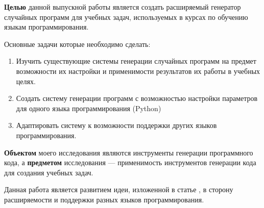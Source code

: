 \textbf{Целью} данной выпускной работы является
создать расширяемый генератор случайных программ для учебных задач, используемых в курсах по обучению языкам программирования.

Основные задачи которые необходимо сделать:
\begin{enumerate}[label=\alph*.]
    \item Изучить существующие системы генерации случайных программ на предмет возможности их
          настройки и применимости результатов их работы в учебных целях.
    \item Создать систему
          генерации программ с возможностью настройки параметров для одного языка программирования (Python)
    \item Адаптировать систему к возможности поддержки других языков программирования.
\end{enumerate}

\textbf{Объектом} моего исследования являются инструменты генерации программного кода, а
\textbf{предметом} исследования --- применимость инструментов генерации кода для создания учебных задач.

Данная работа является развитием идеи, изложенной в статье \cite{hafiz}, в сторону расширяемости и поддержки разных языков программирования.